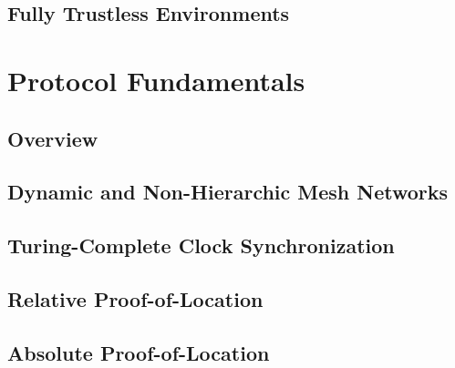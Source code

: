 \documentclass[12pt]{article}
\newcommand{\pol}{Proof-of-Location}
\begin{document}
\subsection{Fully Trustless Environments} \label{sec:related-work-fully-trustless}



\newpage
\section{Protocol Fundamentals} \label{sec:protocol-fundamentals}



\subsection{Overview} \label{sec:protocol-fundamentals-overview}



\subsection{Dynamic and Non-Hierarchic Mesh Networks} \label{sec:protocol-fundamentals-mesh}



\subsection{Turing-Complete Clock Synchronization} \label{sec:protocol-fundamentals-clock}

\subsection{Relative \pol{}} \label{sec:protocol-fundamentals-rel-pol}

\subsection{Absolute \pol{}} \label{sec:protocol-fundamentals-abs-pol}


% 
\end{document}
